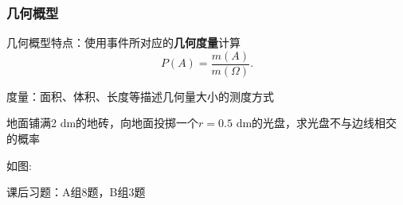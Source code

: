 \subsubsection{几何概型}%
\label{subsub:几何概型}
几何概型特点：使用事件所对应的\textbf{几何度量}计算
\[
    P\left( A \right) =\frac{m\left( A \right) }{m\left( \Omega \right) }
.\] 
\begin{notation}
    度量：面积、体积、长度等描述几何量大小的测度方式
\end{notation}
\begin{eg}
    地面铺满2 dm的地砖，向地面投掷一个$r=0.5$ dm的光盘，求光盘不与边线相交的概率
\end{eg}
如图:
\begin{center}
\end{center}
课后习题：A组8题，B组3题


